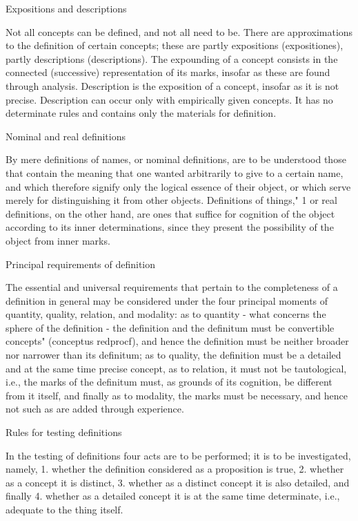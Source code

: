 Expositions and descriptions

Not all concepts can be defined, and not all need to be.
There are approximations to the definition of certain concepts;
these are partly expositions (expositiones), partly descriptions (descriptions).
The expounding of a concept consists in the connected (successive)
representation of its marks, insofar as these are found through analysis.
Description is the exposition of a concept, insofar as it is not precise.
Description can occur only with empirically given concepts. It has no
determinate rules and contains only the materials for definition.

Nominal and real definitions

By mere definitions of names, or nominal definitions, are to be understood
those that contain the meaning that one wanted arbitrarily to give to a
certain name, and which therefore signify only the logical essence of their
object, or which serve merely for distinguishing it from other objects.
Definitions of things," 1 or real definitions, on the other hand, are ones that
suffice for cognition of the object according to its inner determinations,
since they present the possibility of the object from inner marks.

Principal requirements of definition

The essential and universal requirements that pertain to the completeness
of a definition in general may be considered under the four principal
moments of quantity, quality, relation, and modality:
as to quantity - what concerns the sphere of the definition - the definition
and the definitum must be convertible concepts" (conceptus redprocf), and hence
the definition must be neither broader nor narrower than its definitum;
as to quality, the definition must be
a detailed and at the same time precise concept,
as to relation, it must not be tautological,
i.e., the marks of the definitum must, as grounds of its cognition,
be different from it itself, and finally
as to modality, the marks must be necessary, and
hence not such as are added through experience.

Rules for testing definitions

In the testing of definitions four acts are to be performed;
it is to be investigated, namely,
1.  whether the definition considered as a proposition is true,
2.  whether as a concept it is distinct,
3.  whether as a distinct concept it is also detailed, and finally
4.  whether as a detailed concept it is at the same time determinate,
    i.e., adequate to the thing itself.

